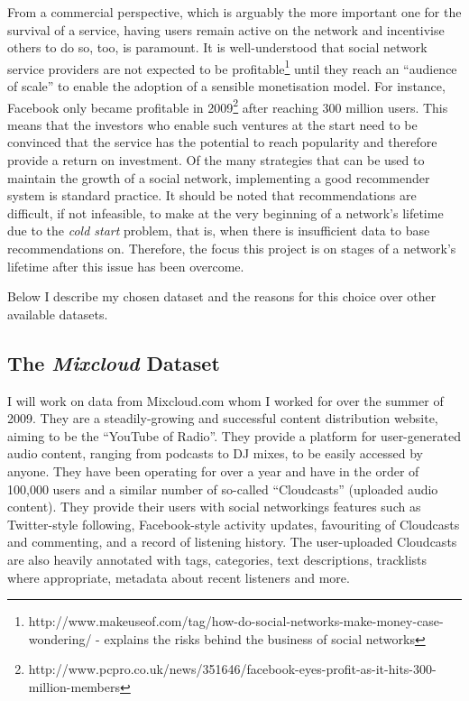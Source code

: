 From a commercial perspective, which is arguably the more important one for the survival of a service, having users remain active on the network and incentivise others to do so, too, is paramount. It is well-understood that social network service providers are not expected to be profitable\footnote{http://www.makeuseof.com/tag/how-do-social-networks-make-money-case-wondering/ - explains the risks behind the business of social networks} until they reach an ``audience of scale'' to enable the adoption of a sensible monetisation model. For instance, Facebook only became profitable in 2009\footnote{http://www.pcpro.co.uk/news/351646/facebook-eyes-profit-as-it-hits-300-million-members} after reaching 300 million users. This means that the investors who enable such ventures at the start need to be convinced that the service has the potential to reach popularity and therefore provide a return on investment. Of the many strategies that can be used to maintain the growth of a social network, implementing a good recommender system is standard practice. It should be noted that recommendations are difficult, if not infeasible, to make at the very beginning of a network's lifetime due to the \emph{cold start} problem, that is, when there is insufficient data to base recommendations on. Therefore, the focus this project is on stages of a network's lifetime after this issue has been overcome.

Below I describe my chosen dataset and the reasons for this choice over other available datasets.

\subsection*{The \emph{Mixcloud} Dataset}

I will work on data from Mixcloud.com whom I worked for over the summer of 2009. They are a steadily-growing and successful content distribution website, aiming to be the ``YouTube of Radio''. They provide a platform for user-generated audio content, ranging from podcasts to DJ mixes, to be easily accessed by anyone. They have been operating for over a year and have in the order of 100,000 users and a similar number of so-called ``Cloudcasts'' (uploaded audio content). They provide their users with social networkings features such as Twitter-style following, Facebook-style activity updates, favouriting of Cloudcasts and commenting, and a record of listening history. The user-uploaded Cloudcasts are also heavily annotated with tags, categories, text descriptions, tracklists where appropriate, metadata about recent listeners and more. 

